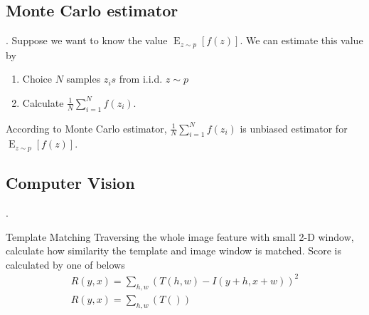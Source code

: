 \documentclass[8pt]{beamer}
\newcommand{\expe}{\operatorname{E}}
\begin{document}
\subsection{Monte Carlo estimator}

\begin{frame}{.}
  Suppose we want to know the value $\expe_{z \sim p}[f(z)]$. We can estimate this value by 
  \begin{enumerate}
    \item Choice $N$ samples $z_is$ from i.i.d. $z \sim p$
    \item Calculate $\frac{1}{N}\sum_{i=1}^N f(z_i)$.
  \end{enumerate}

  According to Monte Carlo estimator, $\frac{1}{N}\sum_{i=1}^N f(z_i)$ is unbiased estimator for $\expe_{z \sim p}[f(z)]$.
\end{frame}

\subsection{Computer Vision}
\begin{frame}{.}
  \begin{block}{Template Matching}
    Traversing the whole image feature with small 2-D window, calculate how similarity the template and image window is matched. Score is calculated by one of belows
    \[
    \begin{gathered}
      R(y,x) = \sum_{h,w} (T(h, w) - I(y+h, x+w))^2 \\
      R(y,x) = \sum_{h,w} (T())
    \end{gathered}
    \]
  \end{block}
\end{frame}
\end{document}

